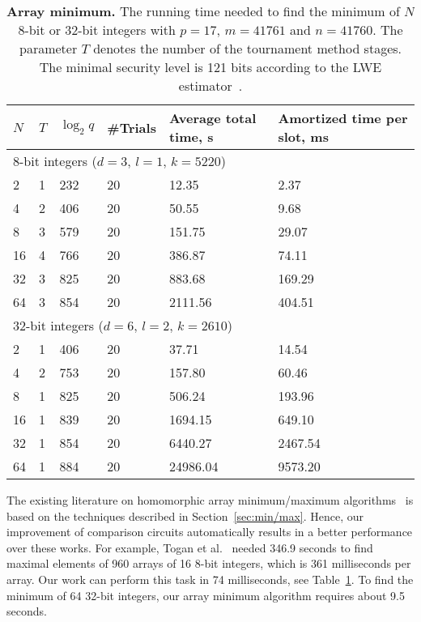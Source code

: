 \begin{table}[h]
  \centering
  \begin{tabular*}{.45\textwidth}{ p{0.2cm} p{0.2cm} p{0.8cm} p{0.9cm} p{1.5cm} p{2.0cm}}
    \toprule
    $N$     & $T$   & $\log_2 q$    & \#Trials  & Average total time, s    & Amortized time per slot, ms \\
    \midrule
    \multicolumn{6}{l}{8-bit integers ($d=3$, $l=1$, $k=5220$)} \\
    \cmidrule(lr){1-6}
    2       & 1     & 232           & 20        & 12.35     & 2.37 \\
    4       & 2     & 406           & 20        & 50.55     & 9.68 \\
    8       & 3     & 579           & 20        & 151.75    & 29.07 \\
    16      & 4     & 766           & 20        & 386.87    & 74.11 \\
    32      & 3     & 825           & 20        & 883.68    & 169.29 \\
    64      & 3     & 854           & 20        & 2111.56   & 404.51 \\
    \midrule
    \multicolumn{6}{l}{32-bit integers ($d=6$, $l=2$, $k=2610$)} \\
    \cmidrule(lr){1-6}
    2       & 1     & 406           & 20        & 37.71     & 14.54 \\
    4       & 2     & 753           & 20        & 157.80    & 60.46 \\
    8       & 1     & 825           & 20        & 506.24    & 193.96 \\
    16      & 1     & 839           & 20        & 1694.15   & 649.10 \\
    32      & 1     & 854           & 20        & 6440.27   & 2467.54 \\
    64      & 1     & 884           & 20        & 24986.04  & 9573.20 \\
    \bottomrule
  \end{tabular*}
  \caption{\textbf{Array minimum.} The running time needed to find the minimum of $N$ 8-bit or 32-bit integers with $p=17$, $m=41761$ and $n=41760$. The parameter $T$ denotes the number of the tournament method stages. The minimal security level is 121 bits according to the LWE estimator~\cite{lwe_estimator}.}
  \label{table:minimum_circuit_results}
\end{table}

The existing literature on homomorphic array minimum/maximum algorithms~\cite{TMP15,PoPETS:SFR20} is based on the techniques described in Section~\ref{sec:min/max}.
Hence, our improvement of comparison circuits automatically results in a better performance over these works.  
For example, Togan et al.~\cite{TMP15} needed 346.9 seconds to find maximal elements of 960 arrays of 16 8-bit integers, which is 361 milliseconds per array.
Our work can perform this task in 74 milliseconds, see Table~\ref{table:minimum_circuit_results}.
To find the minimum of 64 32-bit integers, our array minimum algorithm requires about 9.5 seconds.

